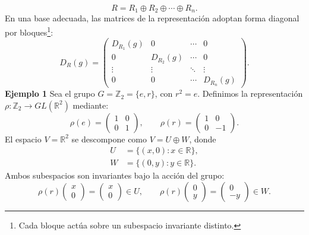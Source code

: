 \documentclass[a4paper,11pt]{book} %
\begin{document}
\begin{equation}
    R
    =
    R_1 \oplus R_2 \oplus \cdots \oplus R_n.
\end{equation}
\noindent
En una base adecuada, las matrices de la representación adoptan forma diagonal
por bloques\footnote{Cada bloque actúa sobre un subespacio invariante distinto.}:
\begin{equation}
    D_R(g)
    =
    \begin{pmatrix}
        D_{R_1}(g) & 0 & \cdots & 0 \\
        0 & D_{R_2}(g) & \cdots & 0 \\
        \vdots & \vdots & \ddots & \vdots \\
        0 & 0 & \cdots & D_{R_n}(g)
    \end{pmatrix}.
\end{equation}
\newpage
\noindent
\textbf{Ejemplo 1} 
\medskip\newline\noindent
Sea el grupo $G = \mathbb{Z}_2 = \{e, r\}$, con $r^2 = e$. Definimos la representación
$\rho : \mathbb{Z}_2 \to GL(\mathbb{R}^2)$ mediante:
\begin{equation}
    \rho(e) = \begin{pmatrix} 1 & 0 \\ 0 & 1 \end{pmatrix}, \qquad
    \rho(r) = \begin{pmatrix} 1 & 0 \\ 0 & -1 \end{pmatrix}.
\end{equation}
\noindent
El espacio $V = \mathbb{R}^2$ se descompone como $V = U \oplus W$, donde
\begin{align*}
    U &= \{(x, 0) : x \in \mathbb{R}\}, \\
    W &= \{(0, y) : y \in \mathbb{R}\}.
\end{align*}
\noindent
Ambos subespacios son invariantes bajo la acción del grupo:
\begin{equation}
    \rho(r)\begin{pmatrix} x \\ 0 \end{pmatrix} = \begin{pmatrix} x \\ 0 \end{pmatrix} \in U,
    \qquad
    \rho(r)\begin{pmatrix} 0 \\ y \end{pmatrix} = \begin{pmatrix} 0 \\ -y \end{pmatrix} \in W.
\end{equation}
\end{document}
